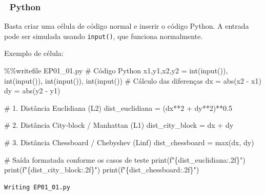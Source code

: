 \documentclass[
  portuguese,
  letterpaper,
  openany,
  oneside,
  12pt,
  a4paper]{book}
\newenvironment{Shaded}{\begin{snugshade}}{\end{snugshade}}
\newcommand{\BuiltInTok}[1]{\textcolor[rgb]{0.00,0.23,0.31}{#1}}
\newcommand{\CommentTok}[1]{\textcolor[rgb]{0.37,0.37,0.37}{#1}}
\newcommand{\DecValTok}[1]{\textcolor[rgb]{0.68,0.00,0.00}{#1}}
\newcommand{\FloatTok}[1]{\textcolor[rgb]{0.68,0.00,0.00}{#1}}
\newcommand{\NormalTok}[1]{\textcolor[rgb]{0.00,0.23,0.31}{#1}}
\newcommand{\OperatorTok}[1]{\textcolor[rgb]{0.37,0.37,0.37}{#1}}
\newcommand{\SpecialCharTok}[1]{\textcolor[rgb]{0.37,0.37,0.37}{#1}}
\newcommand{\SpecialStringTok}[1]{\textcolor[rgb]{0.13,0.47,0.30}{#1}}
\begin{document}
\subsubsection{🐍 Python}\label{python}

Basta criar uma célula de código normal e inserir o código Python. A
entrada pode ser simulada usando \texttt{input()}, que funciona
normalmente.

Exemplo de célula:

\begin{Shaded}
\begin{Highlighting}[]
\OperatorTok{\%\%}\NormalTok{writefile EP01\_01.py}
\CommentTok{\# Código Python}
\NormalTok{x1,y1,x2,y2 }\OperatorTok{=} \BuiltInTok{int}\NormalTok{(}\BuiltInTok{input}\NormalTok{()), }\BuiltInTok{int}\NormalTok{(}\BuiltInTok{input}\NormalTok{()), }\BuiltInTok{int}\NormalTok{(}\BuiltInTok{input}\NormalTok{()), }\BuiltInTok{int}\NormalTok{(}\BuiltInTok{input}\NormalTok{())}
\CommentTok{\# Cálculo das diferenças}
\NormalTok{dx }\OperatorTok{=} \BuiltInTok{abs}\NormalTok{(x2 }\OperatorTok{{-}}\NormalTok{ x1)}
\NormalTok{dy }\OperatorTok{=} \BuiltInTok{abs}\NormalTok{(y2 }\OperatorTok{{-}}\NormalTok{ y1)}

\CommentTok{\# 1. Distância Euclidiana (L2)}
\NormalTok{dist\_euclidiana }\OperatorTok{=}\NormalTok{ (dx}\OperatorTok{**}\DecValTok{2} \OperatorTok{+}\NormalTok{ dy}\OperatorTok{**}\DecValTok{2}\NormalTok{)}\OperatorTok{**}\FloatTok{0.5}

\CommentTok{\# 2. Distância City{-}block / Manhattan (L1)}
\NormalTok{dist\_city\_block }\OperatorTok{=}\NormalTok{ dx }\OperatorTok{+}\NormalTok{ dy}

\CommentTok{\# 3. Distância Chessboard / Chebyshev (Linf)}
\NormalTok{dist\_chessboard }\OperatorTok{=} \BuiltInTok{max}\NormalTok{(dx, dy)}

\CommentTok{\# Saída formatada conforme os casos de teste}
\BuiltInTok{print}\NormalTok{(}\SpecialStringTok{f"}\SpecialCharTok{\{}\NormalTok{dist\_euclidiana}\SpecialCharTok{:.2f\}}\SpecialStringTok{"}\NormalTok{)}
\BuiltInTok{print}\NormalTok{(}\SpecialStringTok{f"}\SpecialCharTok{\{}\NormalTok{dist\_city\_block}\SpecialCharTok{:.2f\}}\SpecialStringTok{"}\NormalTok{)}
\BuiltInTok{print}\NormalTok{(}\SpecialStringTok{f"}\SpecialCharTok{\{}\NormalTok{dist\_chessboard}\SpecialCharTok{:.2f\}}\SpecialStringTok{"}\NormalTok{)}
\end{Highlighting}
\end{Shaded}

\begin{verbatim}
Writing EP01_01.py
\end{verbatim}
\end{document}
